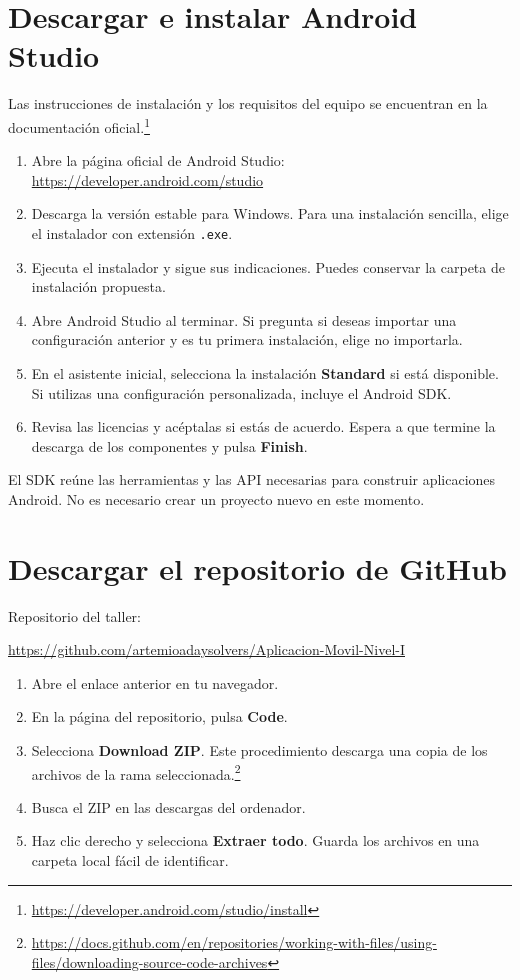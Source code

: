 \documentclass[12pt,a4paper]{article}
\begin{document}
\section{Descargar e instalar Android Studio}

Las instrucciones de instalación y los requisitos del equipo se encuentran en la documentación oficial.\footnote{\url{https://developer.android.com/studio/install}}

\begin{enumerate}
    \item Abre la página oficial de Android Studio:
    \url{https://developer.android.com/studio}
    \item Descarga la versión estable para Windows. Para una instalación sencilla, elige el instalador con extensión \texttt{.exe}.
    \item Ejecuta el instalador y sigue sus indicaciones. Puedes conservar la carpeta de instalación propuesta.
    \item Abre Android Studio al terminar. Si pregunta si deseas importar una configuración anterior y es tu primera instalación, elige no importarla.
    \item En el asistente inicial, selecciona la instalación \textbf{Standard} si está disponible. Si utilizas una configuración personalizada, incluye el Android SDK.
    \item Revisa las licencias y acéptalas si estás de acuerdo. Espera a que termine la descarga de los componentes y pulsa \textbf{Finish}.
\end{enumerate}

El SDK reúne las herramientas y las API necesarias para construir aplicaciones Android. No es necesario crear un proyecto nuevo en este momento.

\section{Descargar el repositorio de GitHub}

Repositorio del taller:

\url{https://github.com/artemioadaysolvers/Aplicacion-Movil-Nivel-I}

\begin{enumerate}
    \item Abre el enlace anterior en tu navegador.
    \item En la página del repositorio, pulsa \textbf{Code}.
    \item Selecciona \textbf{Download ZIP}. Este procedimiento descarga una copia de los archivos de la rama seleccionada.\footnote{\url{https://docs.github.com/en/repositories/working-with-files/using-files/downloading-source-code-archives}}
    \item Busca el ZIP en las descargas del ordenador.
    \item Haz clic derecho y selecciona \textbf{Extraer todo}. Guarda los archivos en una carpeta local fácil de identificar.
\end{enumerate}
\end{document}
